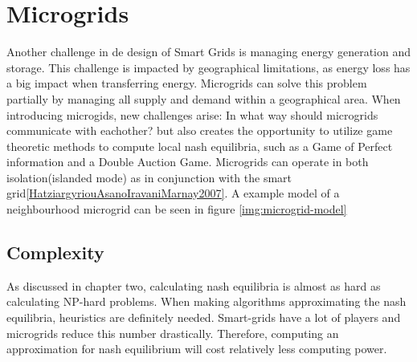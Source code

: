 \newpage
\section{Microgrids}


Another challenge in de design of Smart Grids is managing energy generation and storage. This challenge is impacted by geographical limitations, as energy loss has a big  impact when transferring energy.
Microgrids can solve this problem partially by managing all supply and demand within a geographical area. When introducing microgids, new challenges arise: In what way should microgrids communicate with eachother? but also creates the opportunity to utilize game theoretic methods to compute local nash equilibria, such as a Game of Perfect information and a Double Auction Game.
Microgrids can operate in both isolation(islanded mode) as in conjunction with the smart grid\ref{HatziargyriouAsanoIravaniMarnay2007}. 
A example model of a neighbourhood microgrid can be seen in figure \ref{img:microgrid-model}



\subsection{Complexity}
As discussed in chapter two, calculating nash equilibria is almost as hard as calculating NP-hard problems. When making algorithms approximating the nash equilibria, heuristics are definitely needed. Smart-grids have a lot of players and microgrids reduce this number drastically. Therefore, computing an approximation for nash equilibrium will cost relatively less computing power.


